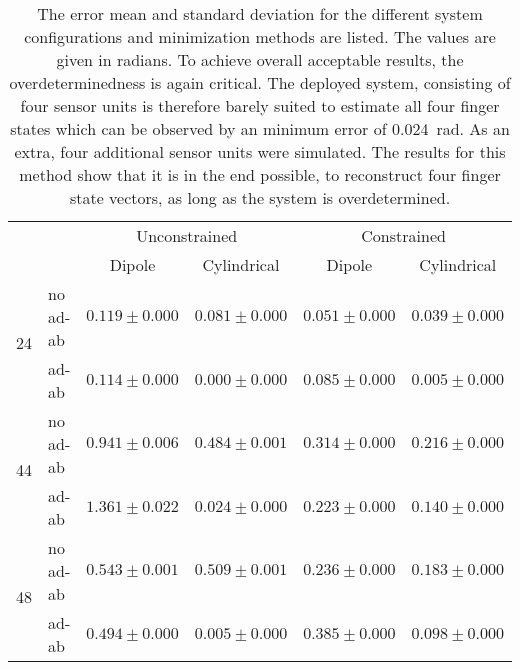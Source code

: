 \begin{table}[h]
\centering
\begin{tabular}{l l c c c c}
\toprule
 & &          				\multicolumn{2}{c}{Unconstrained}          &		\multicolumn{2}{c}{Constrained}\\ \cmidrule(lr){3-4}\cmidrule(lr){5-6}
 & & 								Dipole   			   & Cylindrical 	 			 & 		Dipole 			& 		Cylindrical \\ \midrule[2pt]
\multirow{2}{*}{24} & no ad-ab    & $ 0.119 \pm 0.000 $ & $ 0.081 \pm 0.000 $ & $ 0.051 \pm 0.000 $ & $ 0.039 \pm 0.000 $ \\ 
					& ad-ab		 & $ 0.114 \pm 0.000 $ & $ 0.000 \pm 0.000 $ & $ 0.085 \pm 0.000 $ & $ 0.005 \pm 0.000 $ \\ \midrule
\multirow{2}{*}{44} & no ad-ab    & $ 0.941 \pm 0.006 $ & $ 0.484 \pm 0.001 $ & $ 0.314 \pm 0.000 $ & $ 0.216 \pm 0.000 $ \\
					& ad-ab		 & $ 1.361 \pm 0.022 $ & $ 0.024 \pm 0.000 $ & $ 0.223 \pm 0.000 $ & $ 0.140 \pm 0.000 $ \\ \midrule
\multirow{2}{*}{48} & no ad-ab    & $ 0.543 \pm 0.001 $ & $ 0.509 \pm 0.001 $ & $ 0.236 \pm 0.000 $ & $ 0.183 \pm 0.000 $ \\ 
					& ad-ab		 & $ 0.494 \pm 0.000 $ & $ 0.005 \pm 0.000 $ & $ 0.385 \pm 0.000 $ & $ 0.098 \pm 0.000 $\\										
\bottomrule
\end{tabular}
\caption[Quality of the different minimization methods for estimating multiple fingers]
{The error mean and standard deviation for the different system configurations and minimization methods are listed. The values are given in radians. To achieve overall acceptable results, the overdeterminedness is again critical. The deployed system, consisting of four sensor units is therefore barely suited to estimate all four finger states which can be observed by an minimum error of \SI{0.024}{\radian}. As an extra, four additional sensor units were simulated. The results for this method show that it is in the end possible, to reconstruct four finger state vectors, as long as the system is overdetermined.}
\label{tab:multFing}
\end{table}


